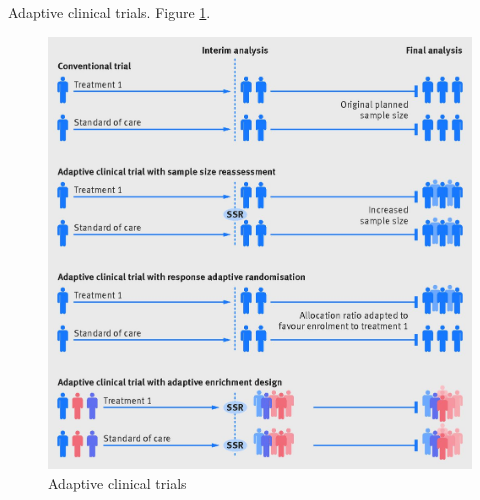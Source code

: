 \documentclass[english]{article}
\begin{document}
\item {Adaptive clinical trials}. Figure \ref{ada_ct}.
\begin{figure}[h!]
\begin{center}
\includegraphics[width=0.5\paperwidth]{ada}
    \caption{Adaptive clinical trials}
    \label{ada_ct}
\end{center}
\end{figure}
\end{document}
